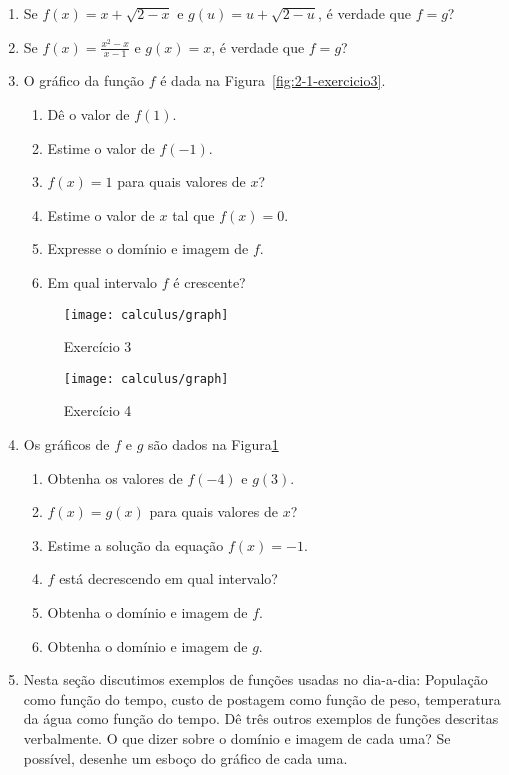 \begin{enumerate}[label=\textbf{\arabic*.},leftmargin=*]
  \item Se $f(x)=x+\sqrt{2-x}$ e $g(u)=u+\sqrt{2-u}$, é verdade que $f=g$?
  \item Se $\displaystyle f(x)=\frac{x^2-x}{x-1}$ e $\displaystyle g(x)=x$, é verdade que $f=g$?
  \item O gráfico da função $f$ é dada na Figura~\ref{fig:2-1-exercicio3}.
  \begin{enumerate}
    \item Dê o valor de $f(1)$.
    \item Estime o valor de $f(-1)$.
    \item $f(x)=1$ para quais valores de $x$?
    \item Estime o valor de $x$ tal que $f(x)=0$.
    \item Expresse o domínio e imagem de $f$.
    \item Em qual intervalo $f$ é crescente?
  \end{enumerate}\vspace{-0.3cm}
  \begin{figure}[!ht]
    \centering
    \begin{minipage}{0.4\columnwidth}
        \texttt{[image: calculus/graph]}
        \caption{Exercício 3}
        \label{fig:2-1-exercicio3}
    \end{minipage}
    \begin{minipage}{0.4\columnwidth}
        \texttt{[image: calculus/graph]}
        \caption{Exercício 4}
        \label{fig:2-1-exercicio4}
    \end{minipage}
  \end{figure}
  \item Os gráficos de $f$ e $g$ são dados na Figura\ref{fig:2-1-exercicio4}
  \begin{enumerate}
    \item Obtenha os valores de $f(-4)$ e $g(3)$.
    \item $f(x)=g(x)$ para quais valores de $x$?
    \item Estime a solução da equação $f(x)=-1$.
    \item $f$ está decrescendo em qual intervalo?
    \item Obtenha o domínio e imagem de $f$.
    \item Obtenha o domínio e imagem de $g$.
  \end{enumerate}
  \item Nesta seção discutimos exemplos de funções usadas no dia-a-dia: População como função do tempo, custo de postagem como função de peso, temperatura da água como função do tempo. Dê três outros exemplos de funções descritas verbalmente. O que dizer sobre o domínio e imagem de cada uma? Se possível, desenhe um esboço do gráfico de cada uma.
  

\end{enumerate}
